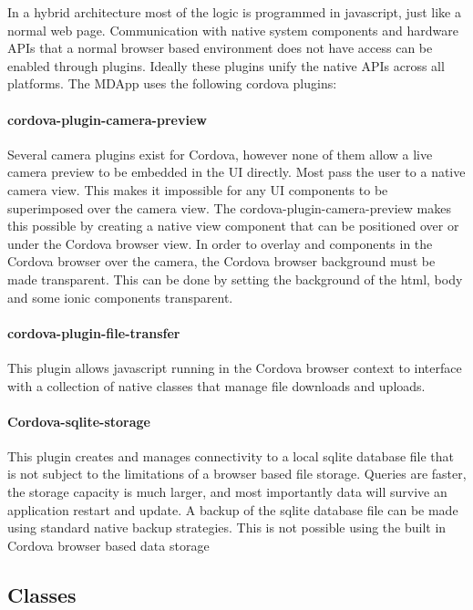 In a hybrid architecture most of the logic is programmed in javascript, just like a normal web page. Communication with native system components and hardware APIs that a normal browser based environment does not have access can be enabled through plugins. Ideally these plugins unify the native APIs across all platforms. The MDApp uses the following cordova plugins:

   \paragraph{cordova-plugin-camera-preview}
   Several camera plugins exist for Cordova, however none of them allow a live camera preview to be embedded in the UI directly. Most pass the user to a native camera view. This makes it impossible for any UI components to be superimposed over the camera view. The cordova-plugin-camera-preview makes this possible by creating a native view component that can be positioned over or under the Cordova browser view. In order to overlay and components in the Cordova browser over the camera, the Cordova browser background must be made transparent. This can be done by setting the background of the html, body and some ionic components transparent.

   \paragraph{cordova-plugin-file-transfer}

   This plugin allows javascript running in the Cordova browser context to interface with a collection of native classes that manage file downloads and uploads.

   \paragraph{Cordova-sqlite-storage}

This plugin creates and manages connectivity to a local sqlite database file that is not subject to the limitations of a browser based file storage. Queries are faster, the storage capacity is much larger, and most importantly data will survive an application restart and update. A backup of the sqlite database file can be made using standard native backup strategies. This is not possible using the built in Cordova browser based data storage


\subsection{Classes}

